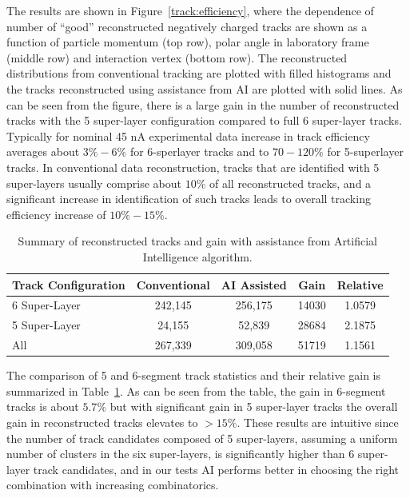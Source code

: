 The results are shown in Figure~\ref{track:efficiency}, where the dependence of number 
of ``good'' reconstructed negatively charged tracks are shown as a function of particle 
momentum (top row), polar angle in laboratory frame (middle row) and interaction vertex 
(bottom row). The reconstructed distributions from conventional tracking are plotted with 
filled histograms and the tracks reconstructed using assistance from AI are plotted with 
solid lines. As can be seen from the figure, there is a large gain in the number of reconstructed 
tracks with the 5 super-layer configuration compared to full 6 super-layer tracks. Typically 
for nominal 45 nA experimental data increase in track efficiency averages about $3\%-6\%$ 
for 6-sperlayer tracks and to $70-120\%$ for 5-superlayer tracks. In conventional data 
reconstruction, tracks that are identified with 5 super-layers usually comprise about $10\%$ 
of all reconstructed tracks, and a significant increase in identification of such tracks leads to 
overall tracking efficiency increase of $10\%-15\%$. 
 
 \begin{table}[!h]
 \begin{center}
 \begin{tabular}{|l|c|c|c|c|}
 \hline
 Track Configuration & Conventional & AI Assisted & Gain & Relative \\
 \hline
 \hline
 6 Super-Layer & 242,145 & 256,175 & 14030 & 1.0579 \\
 5 Super-Layer & 24,155 & 52,839 & 28684 & 2.1875 \\
 All & 267,339 & 309,058 & 51719 & 1.1561 \\
 \hline
 \end{tabular}
 \end{center}
 \caption{Summary of reconstructed tracks and gain with assistance from Artificial Intelligence algorithm.}
 \label{tbl:summary}
 \end{table}
 
The comparison of 5 and 6-segment track statistics and their relative gain is 
summarized in Table~\ref{tbl:summary}. As can be seen from the table, the 
gain in 6-segment tracks is about $5.7\%$ but with significant gain in 5 super-layer tracks 
the overall gain in reconstructed tracks elevates to $>15\%$. These results are intuitive 
since the number of track candidates composed of 5 super-layers, assuming a uniform 
number of clusters in the six super-layers, is significantly higher than 6 super-layer track 
candidates, and in our tests AI performs better in choosing the right combination with 
increasing combinatorics.
 
